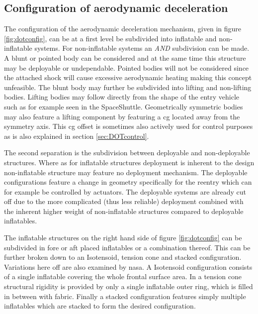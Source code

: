 \subsection{Configuration of aerodynamic deceleration}
The configuration of the aerodynamic deceleration mechanism, given in figure \ref{fig:dotconfig}, can be at a first level be subdivided into inflatable and non-inflatable systems. For non-inflatable systems an \textit{AND} subdivision can be made. A blunt or pointed body can be considered and at the same time this structure may be deployable or undependable. Pointed bodies will not be considered since the attached shock will cause excessive aerodynamic heating \cite{AndersonJr.2007} making this concept unfeasible. The blunt body may further be subdivided into lifting and non-lifting bodies. Lifting bodies may follow directly from the shape of the entry vehicle such as for example seen in the SpaceShuttle. Geometrically symmetric bodies may also feature a lifting component by featuring a \gls{cg} located away from the symmetry axis. This \gls{cg} offset is sometimes also actively used for control purposes\cite{Dillman2012} as is also explained in section \ref{sec:DOTcontrol}. 

The second separation is  the subdivision between deployable and non-deployable structures. Where as for inflatable structures deployment is inherent to the design non-inflatable structure may feature no deployment mechanism. The deployable configurations feature a change in geometry specifically for the reentry which can for example be controlled by actuators. The deployable systems are already cut off due to the more complicated (thus less reliable) deployment combined with the inherent higher weight of non-inflatable structures\cite{Cianciolo2010} compared to deployable inflatables.

The inflatable structures on the right hand side of figure \ref{fig:dotconfig} can be subdivided in fore or aft placed inflatables or a combination thereof. This can be further broken down to an Isotensoid, tension cone and stacked configuration. Variations here off are also examined by \gls{nasa}\cite{Smith2010}. A Isotensoid configuration consists of a single inflatable covering the whole frontal surface area. In a tension cone structural rigidity is provided by only a single inflatable outer ring, which is filled in between with fabric. Finally a stacked configuration features simply multiple inflatables which are stacked to form the desired configuration.



